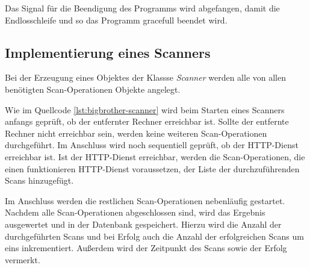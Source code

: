 Das Signal für die Beendigung des Programms wird abgefangen, damit die Endlosschleife und so das Programm gracefull beendet wird.

\subsection{Implementierung eines Scanners}
Bei der Erzeugung eines Objektes der Klassse \textit{Scanner} werden alle von allen benötigten Scan-Operationen Objekte angelegt.

Wie im Quellcode \autoref{lst:bigbrother-scanner} wird beim Starten eines Scanners anfangs geprüft, ob der entfernter Rechner erreichbar ist. Sollte der entfernte Rechner nicht erreichbar sein, werden keine weiteren Scan-Operationen durchgeführt. Im Anschluss wird noch sequentiell geprüft, ob der HTTP-Dienst erreichbar ist. Ist der HTTP-Dienst erreichbar, werden die Scan-Operationen, die einen funktionieren HTTP-Dienst voraussetzen, der Liste der durchzuführenden Scans  hinzugefügt.

Im Anschluss werden die restlichen Scan-Operationen nebenläufig gestartet. Nachdem alle Scan-Operationen abgeschlossen sind, wird das Ergebnis ausgewertet und in der Datenbank gespeichert. Hierzu wird die Anzahl der durchgeführten Scans und bei Erfolg auch die Anzahl der erfolgreichen Scans um eins inkrementiert. Außerdem wird der Zeitpunkt des Scans sowie der Erfolg vermerkt.

